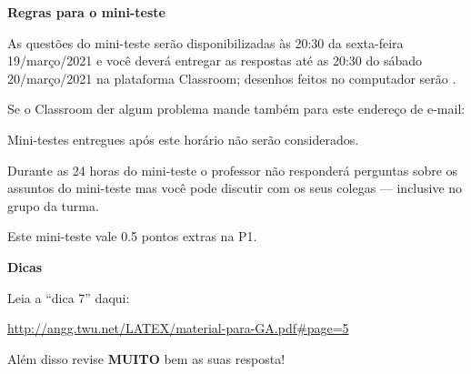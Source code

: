 \documentclass[oneside,12pt]{article}
\begin{document}
\newpage

%

{\bf Regras para o mini-teste}


As questões do mini-teste serão disponibilizadas às 20:30 da
sexta-feira 19/março/2021 e você deverá entregar as respostas
 até as 20:30 do sábado 20/março/2021 na
plataforma Classroom; desenhos feitos no computador serão
.

Se o Classroom der algum problema mande também para este endereço de
e-mail:

\ssk


\ssk

Mini-testes entregues após este horário não serão considerados.


Durante as 24 horas do mini-teste o professor não responderá perguntas
sobre os assuntos do mini-teste mas você pode discutir com os seus
colegas --- inclusive no grupo da turma.

Este mini-teste vale 0.5 pontos extras na P1.


\newpage


{\bf Dicas}

\ssk

Leia a ``dica 7'' daqui:

\ssk

\url{http://angg.twu.net/LATEX/material-para-GA.pdf\#page=5}

\bsk

Além disso revise {\bf MUITO} bem as suas resposta!
\end{document}
